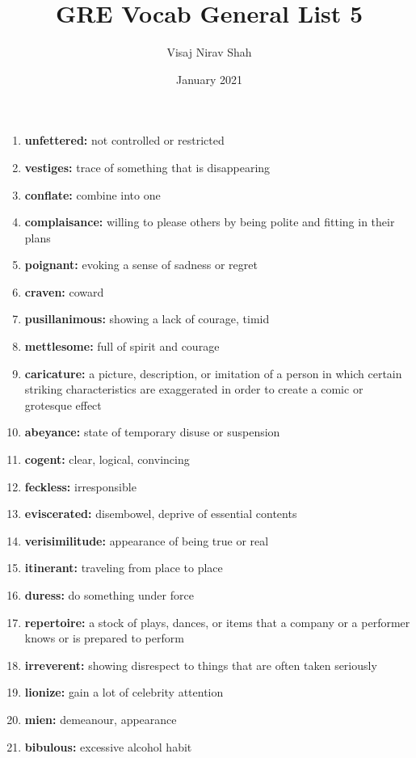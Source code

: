 \documentclass{article}
\title{\textbf{GRE Vocab General List 5}}
\author{Visaj Nirav Shah}
\date{January 2021}
\begin{document}
\maketitle

\begin{enumerate}
    \item \textbf{unfettered: }{not controlled or restricted}
    \item \textbf{vestiges: }{trace of something that is disappearing}
    \item \textbf{conflate: }{combine into one}
    \item \textbf{complaisance: }{willing to please others by being polite and fitting in their plans}
    \item \textbf{poignant: }{evoking a sense of sadness or regret}
    \item \textbf{craven: }{coward}
    \item \textbf{pusillanimous: }{showing a lack of courage, timid}
    \item \textbf{mettlesome: }{full of spirit and courage}
    \item \textbf{caricature: }{a picture, description, or imitation of a person in which certain striking characteristics are exaggerated in order to create a comic or grotesque effect}
    \item \textbf{abeyance: }{state of temporary disuse or suspension}
    \item \textbf{cogent: }{clear, logical, convincing}
    \item \textbf{feckless: }{irresponsible}
    \item \textbf{eviscerated: }{disembowel, deprive of essential contents}
    \item \textbf{verisimilitude: }{appearance of being true or real}
    \item \textbf{itinerant: }{traveling from place to place}
    \item \textbf{duress: }{do something under force}
    \item \textbf{repertoire: }{a stock of plays, dances, or items that a company or a performer knows or is prepared to perform}
    \item \textbf{irreverent: }{showing disrespect to things that are often taken seriously}
    \item \textbf{lionize: }{gain a lot of celebrity attention}
    \item \textbf{mien: }{demeanour, appearance}
    \item \textbf{bibulous: }{excessive alcohol habit}

\end{enumerate}
\end{document}
